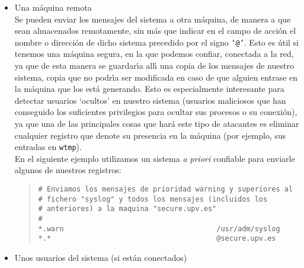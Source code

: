 \begin{itemize}
{syslogd}, mediante \'ordenes como {\tt mkfifo} o {\tt mknod}. Esto es \'util
para {\it debug} y tambi\'en para procesar los registros utilizando cualquier
aplicaci\'on de Unix, tal y como veremos al hablar de {\it logs} remotos 
cifrados.\\
Por ejemplo, la siguiente l\'{\i}nea de {\tt /etc/syslog.conf} enviar\'{\i}a
todos los mensajes de cualquier prioridad a uno de estos ficheros denominado
{\tt /var/log/mififo}:
\begin{quote}
\begin{verbatim}
# Enviamos todos los mensajes a la tuberia con nombre
# /var/log/mififo
#
*.*                                       |/var/log/mififo
\end{verbatim}
\end{quote}
\item{}Una m\'aquina remota\\
Se pueden enviar los mensajes del sistema a otra m\'aquina, de manera a que
sean almacenados remotamente, sin m\'as que indicar en el campo de acci\'on el
nombre o direcci\'on de dicho sistema precedido por el signo {\tt `@'}. Esto es 
\'util si tenemos una m\'aquina segura, en la que podemos confiar, conectada a 
la red, ya que de esta manera se guardar\'{\i}a all\'{\i} una copia de los 
mensajes de nuestro sistema, copia que no podr\'{\i}a ser modificada en caso de 
que alguien entrase en la m\'aquina que los est\'a generando. Esto es
especialmente interesante para detectar usuarios `ocultos' en nuestro sistema
(usuarios maliciosos que han conseguido los suficientes privilegios para ocultar
sus procesos o su conexi\'on), ya que una de las principales cosas que har\'a
este tipo de atacantes es eliminar cualquier registro que denote su presencia
en la m\'aquina (por ejemplo, sus entradas en {\tt wtmp}).\\
En el siguiente ejemplo utilizamos un sistema {\it a priori} confiable para
enviarle algunos de nuestros registros:
\begin{quote}
\begin{verbatim}
# Enviamos los mensajes de prioridad warning y superiores al 
# fichero "syslog" y todos los mensajes (incluidos los 
# anteriores) a la maquina "secure.upv.es"
#
*.warn                                    /usr/adm/syslog
*.*                                       @secure.upv.es
\end{verbatim}
\end{quote}
\item{}Unos usuarios del sistema (si est\'an conectados)\\

\end{itemize}
